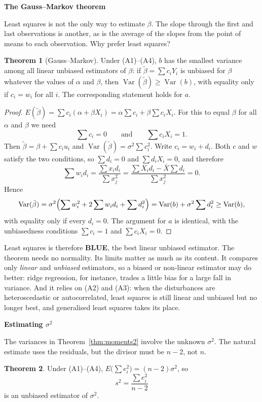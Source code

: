\documentclass[11pt,a4paper]{article}
\numberwithin{equation}{section}
\DeclareMathOperator{\Var}{Var}
\theoremstyle{definition}
\newtheorem{thm}{Theorem}[subsection]
\newcommand{\subhead}[1]{%
  \par\medskip\noindent\textbf{#1}\par\nobreak\smallskip}
\begin{document}
\subhead{The Gauss--Markov theorem}
Least squares is not the only way to estimate $\beta$. The slope through the first and last observations is another, as is the average of the
slopes from the point of means to each observation. Why prefer least squares?

\begin{thm}[Gauss--Markov]
\label{thm:gm2}
Under (A1)--(A4), $b$ has the smallest variance among all linear unbiased estimators of $\beta$: if $\tilde\beta = \sum c_iY_i$ is unbiased for
$\beta$ whatever the values of $\alpha$ and $\beta$, then $\Var(\tilde\beta) \geq \Var(b)$, with equality only if $c_i = w_i$ for all $i$. The
corresponding statement holds for $a$.
\end{thm}

\begin{proof}
$E(\tilde\beta) = \sum c_i(\alpha + \beta X_i) = \alpha\sum c_i + \beta\sum c_iX_i$. For this to equal $\beta$ for all $\alpha$ and $\beta$ we need
\[
\sum c_i = 0 \qquad\text{and}\qquad \sum c_iX_i = 1 .
\]
Then $\tilde\beta = \beta + \sum c_iu_i$ and $\Var(\tilde\beta) = \sigma^2\sum c_i^2$. Write $c_i = w_i + d_i$. Both $c$ and $w$ satisfy the two
conditions, so $\sum d_i = 0$ and $\sum d_iX_i = 0$, and therefore
\[
\sum w_id_i = \frac{\sum x_id_i}{\sum x_j^2} = \frac{\sum X_id_i - \bar X\sum d_i}{\sum x_j^2} = 0 .
\]
Hence
\[
\Var(\tilde\beta) = \sigma^2\Bigl(\sum w_i^2 + 2\sum w_id_i + \sum d_i^2\Bigr) = \Var(b) + \sigma^2\sum d_i^2 \geq \Var(b),
\]
with equality only if every $d_i = 0$. The argument for $a$ is identical, with the unbiasedness conditions $\sum c_i = 1$ and $\sum c_iX_i = 0$.
\end{proof}

Least squares is therefore \textbf{BLUE}, the best linear unbiased estimator. The theorem needs no normality. Its limits matter as much as its
content. It compares only \emph{linear} and \emph{unbiased} estimators, so a biased or non-linear estimator may do better: ridge regression, for
instance, trades a little bias for a large fall in variance. And it relies on (A2) and (A3): when the disturbances are heteroscedastic or
autocorrelated, least squares is still linear and unbiased but no longer best, and generalised least squares takes its place.

\subhead{Estimating $\sigma^2$}
The variances in Theorem~\ref{thm:moments2} involve the unknown $\sigma^2$. The natural estimate uses the residuals, but the divisor must be $n - 2$,
not $n$.

\begin{thm}
\label{thm:s2two}
Under (A1)--(A4), $E\bigl(\sum e_i^2\bigr) = (n-2)\sigma^2$, so
\[
s^2 = \frac{\sum e_i^2}{n-2}
\]
is an unbiased estimator of $\sigma^2$.
\end{thm}
\end{document}
